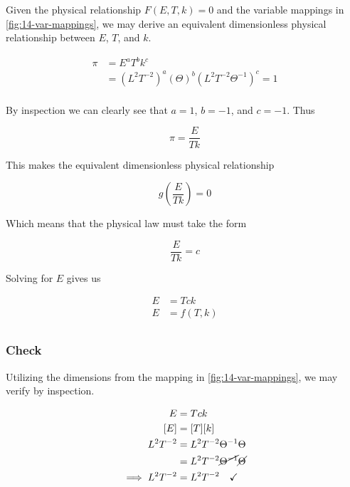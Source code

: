 \documentclass[12pt]{article}
\begin{document}
  Given the physical relationship $F(E,T,k)=0$ and the variable mappings in
  \cref{fig:14-var-mappings}, we may derive an equivalent dimensionless physical
  relationship between $E$, $T$, and $k$.

  \begin{equation}
    \begin{aligned}
      \pi &= E^a T^b k^c \\
      &= {(L^2T^{-2})}^a {(\Theta)}^{b} {(L^2T^{-2}\Theta^{-1})}^c = 1\\
    \end{aligned}
  \end{equation}

  By inspection we can clearly see that $a=1$, $b=-1$, and $c=-1$. Thus

  \begin{equation}
    \pi = \frac{E}{Tk}
  \end{equation}

  This makes the equivalent dimensionless physical relationship

  \begin{equation}
    g\left(\frac{E}{Tk}\right) = 0
  \end{equation}

  Which means that the physical law must take the form

  \begin{equation}
    \frac{E}{Tk} = c
  \end{equation}

  Solving for $E$ gives us

  \begin{equation}
    \boxed{
      \begin{aligned}
        E &= Tck \\
        E &= f(T,k) \\
      \end{aligned}
    }
  \end{equation}

  \subsubsection*{Check}
  Utilizing the dimensions from the mapping in \cref{fig:14-var-mappings}, we
  may verify by inspection.

  \begin{equation}
    \begin{aligned}
      E &= Tck \\
      [E] &= [T][k] \\
      L^2T^{-2} &= L^2T^{-2}\Theta^{-1} \Theta \\
       &= L^2T^{-2} \cancel{\Theta^{-1}} \cancel{\Theta} \\
      \implies L^2T^{-2} &= L^2T^{-2} \quad\checkmark \\
    \end{aligned}
  \end{equation}
\end{document}
